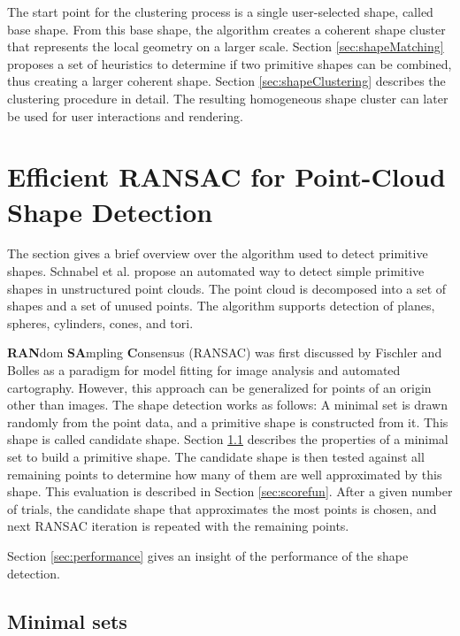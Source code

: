 The start point for the clustering process is a single user-selected shape, called base shape. From this base shape, the algorithm creates a coherent shape cluster that represents the local geometry on a larger scale. Section \ref{sec:shapeMatching} proposes a set of heuristics to determine if two primitive shapes can be combined, thus creating a larger coherent shape. 
Section \ref{sec:shapeClustering} describes the clustering procedure in detail. The resulting homogeneous shape cluster can later be used for user interactions and rendering. 


\section{Efficient RANSAC for Point-Cloud Shape Detection}

\label{sec:schnabel}

The section gives a brief overview over the algorithm used to detect primitive shapes. 
Schnabel et al. \cite{schnabel-2007-efficient} propose an automated way to detect simple primitive shapes in unstructured point clouds. The point cloud is decomposed into a set of shapes and a set of unused points. The algorithm supports detection of planes, spheres, cylinders, cones, and tori. 

\par

\textbf{RAN}dom \textbf{SA}mpling \textbf{C}onsensus (RANSAC) was first discussed by Fischler and Bolles \cite{fischler1981random} as a paradigm for model fitting for image analysis and automated cartography. However, this approach can be generalized for points of an origin other than images. The shape detection works as follows: A minimal set is drawn randomly from the point data, and a primitive shape is constructed from it. This shape is called candidate shape. Section \ref{sec:minimal_sets} describes the properties of a minimal set to build a primitive shape. The candidate shape is then tested against all remaining points to determine how many of them are well approximated by this shape. This evaluation is described in Section \ref{sec:scorefun}. After a given number of trials, the candidate shape that approximates the most points is chosen, and next RANSAC iteration is repeated with the remaining points. 

Section \ref{sec:performance} gives an insight of the performance of the shape detection. 


\subsection{Minimal sets}
\label{sec:minimal_sets}

